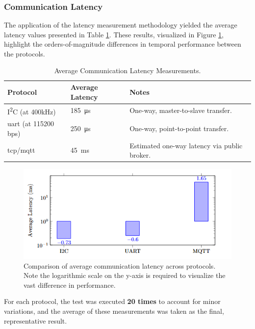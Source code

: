     \subsubsection{Communication Latency}
    \label{subsubsec:latency_results}
    
    The application of the latency measurement methodology yielded the average latency values presented in Table \ref{tab:latency_results}. These results, visualized in Figure \ref{fig:latency_chart}, highlight the orders-of-magnitude differences in temporal performance between the protocols.

    \begin{table}[htb]
    \centering
    \caption{Average Communication Latency Measurements.}
    \label{tab:latency_results}
    \begin{tabular}{l l l}
    \toprule
    \textbf{Protocol} & \textbf{Average Latency} & \textbf{Notes} \\
    \midrule
    I\textsuperscript{2}C (at 400kHz) & \SI{185}{\micro\second} & One-way, master-to-slave transfer. \\
    \gls{uart} (at 115200 bps) & \SI{250}{\micro\second} & One-way, point-to-point transfer. \\
    \gls{tcp}/\gls{mqtt} & \SI{45}{\milli\second} & Estimated one-way latency via public broker. \\
    \bottomrule
    \end{tabular}
    \end{table}

    \begin{figure}[htb!]
        \centering
        \includegraphics[width=0.9\columnwidth]{Chapters/Figures/averageLant.png}
        \caption{Comparison of average communication latency across protocols. Note the logarithmic scale on the y-axis is required to visualize the vast difference in performance.}
        \label{fig:latency_chart}
    \end{figure}
    
For each protocol, the test was executed \textbf{20 times} to account for minor variations, and the average of these measurements was taken as the final, representative result.



